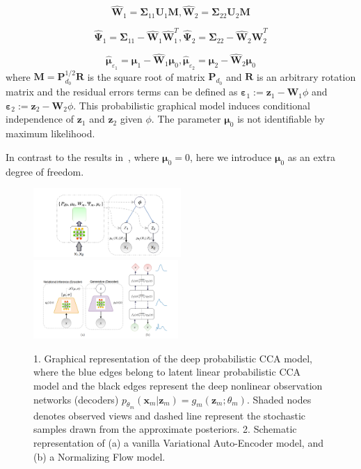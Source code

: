 \documentclass[a4paper,12pt]{article}
\renewcommand{\epsilon}{\ensuremath{\varepsilon}}
\theoremstyle{plain} %
\theoremstyle{definition} %
\theoremstyle{remark} %
\begin{document}
\[\hat{\boldsymbol{W}}_1 = \boldsymbol{\Sigma}_{11}\boldsymbol{U}_1 \boldsymbol{M}, \hat{\boldsymbol{W}}_2 = \boldsymbol{\Sigma}_{22}\boldsymbol{U}_2 \boldsymbol{M}\]
 
\[\hat{\boldsymbol{\Psi}}_1 = \boldsymbol{\Sigma}_{11} - \hat{\boldsymbol{W}}_1\hat{\boldsymbol{W}}_1^T, \hat{\boldsymbol{\Psi}}_2 = \boldsymbol{\Sigma}_{22} - \hat{\boldsymbol{W}}_2\hat{\boldsymbol{W}}_2^T\] 

\[\hat{\boldsymbol{\mu}}_{\epsilon_1} = \boldsymbol{\mu}_1 - \hat{\boldsymbol{W}}_1 \boldsymbol{\mu}_0, \hat{\boldsymbol{\mu}}_{\epsilon_2} = \boldsymbol{\mu}_2 - \hat{\boldsymbol{W}}_2 \boldsymbol{\mu}_0\]
where $\boldsymbol{M} = \boldsymbol{P}^{1/2}_{d_0} \boldsymbol{R}$ is the square root of matrix $\boldsymbol{P}_{d_0}$ and $\boldsymbol{R}$ is an arbitrary rotation matrix and the residual errors terms can be defined as $\boldsymbol{\epsilon}_1 := \boldsymbol{z}_1 - \boldsymbol{W}_1 \phi$
and  $\boldsymbol{\epsilon}_2 := \boldsymbol{z}_2 - \boldsymbol{W}_2 \phi$. This probabilistic graphical model induces conditional
independence of $\boldsymbol{z}_1$ and $\boldsymbol{z}_2$ given $\phi$. The parameter $\boldsymbol{\mu}_0$ is not identifiable by
maximum likelihood. 

In contrast to the results in~\cite{bach2005probabilistic}, where  $\boldsymbol{\mu}_0 = 0$, here we introduce $\boldsymbol{\mu}_0$  as an extra degree of freedom.

\begin{figure}
    \centering
    \includegraphics[width=0.5\textwidth]{images/essay3.png}
    \includegraphics[width=0.49\textwidth]{images/essay4.png}
    \caption{1. Graphical representation of the deep probabilistic CCA model, where the blue edges belong to latent linear probabilistic CCA model and the black edges represent the deep nonlinear observation networks (decoders) $p_{\theta_m} (\textbf{x}_m|\textbf{z}_m) = g_m(\textbf{z}_m; \theta_m)$. Shaded nodes denotes observed views and dashed line represent the stochastic samples drawn from the approximate posteriors. 2. Schematic representation of (a) a vanilla Variational Auto-Encoder model, and (b) a Normalizing Flow model.}
    \label{fig:enter-label}
\end{figure}
\end{document}
